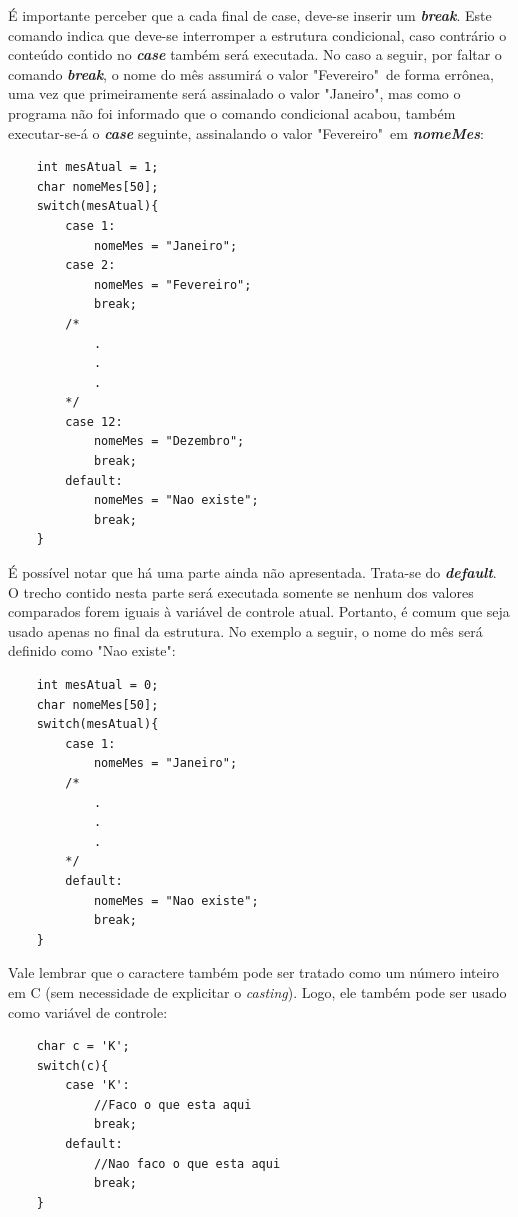\documentclass[12pt]{article}
\newcommand\tab[1][1cm]{\hspace*{#1}}
\begin{document}
\par\tab É importante perceber que a cada final de case, deve-se inserir um \textit{\textbf{break}}. Este comando indica que deve-se interromper a estrutura condicional, caso contrário o conteúdo contido no \textbf{\textit{case}} também será executada. No caso a seguir, por faltar o comando \textit{\textbf{break}}, o nome do mês assumirá o valor "Fevereiro"~de forma errônea, uma vez que primeiramente será assinalado o valor "Janeiro", mas como o programa não foi informado que o comando condicional acabou, também executar-se-á o \textit{\textbf{case}} seguinte, assinalando o valor "Fevereiro"~em \textit{\textbf{nomeMes}}:

\hspace{0.25cm}
\begin{lstlisting}
    int mesAtual = 1;
    char nomeMes[50];
    switch(mesAtual){
        case 1:
            nomeMes = "Janeiro";
        case 2:
            nomeMes = "Fevereiro";
            break;
        /*
            .
            .
            .
        */
        case 12:
            nomeMes = "Dezembro";
            break;
        default:
            nomeMes = "Nao existe";
            break;
    }
\end{lstlisting}

\par\tab É possível notar que há uma parte ainda não apresentada. Trata-se do \textbf{\textit{default}}. O trecho contido nesta parte será executada somente se nenhum dos valores comparados forem iguais à variável de controle atual. Portanto, é comum que seja usado apenas no final da estrutura. No exemplo a seguir, o nome do mês será definido como "Nao existe":

\hspace{0.25cm}
\begin{lstlisting}
    int mesAtual = 0;
    char nomeMes[50];
    switch(mesAtual){
        case 1:
            nomeMes = "Janeiro";
        /*
            .
            .
            .
        */
        default:
            nomeMes = "Nao existe";
            break;
    }
\end{lstlisting}

\par\tab Vale lembrar que o caractere também pode ser tratado como um número inteiro em C (sem necessidade de explicitar o \textit{casting}). Logo, ele também pode ser usado como variável de controle:

\hspace{0.25cm}
\begin{lstlisting}
    char c = 'K';
    switch(c){
        case 'K':
            //Faco o que esta aqui
            break;
        default:
            //Nao faco o que esta aqui
            break;
    }
\end{lstlisting}
\end{document}

